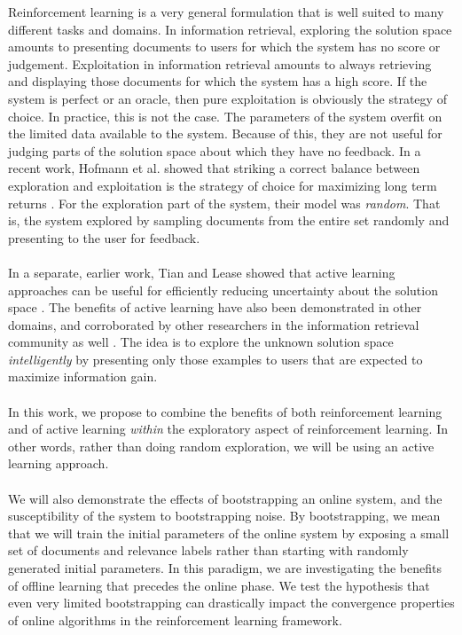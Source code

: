 \documentclass{acm_proc_article-sp}
\begin{document}
Reinforcement learning is a very general formulation that is well suited to many different tasks and domains. In information retrieval, exploring the solution space amounts to presenting documents to users for which the system has no score or judgement. Exploitation in information retrieval amounts to always retrieving and displaying those documents for which the system has a high score. If the system is perfect or an oracle, then pure exploitation is obviously the strategy of choice. In practice, this is not the case. The parameters of the system overfit on the limited data available to the system. Because of this, they are not useful for judging parts of the solution space about which they have no feedback. In a recent work, Hofmann et al. showed that striking a correct balance between exploration and exploitation is the strategy of choice for maximizing long term returns \cite{hofmann}. For the exploration part of the system, their model was \emph{random}. That is, the system explored by sampling documents from the entire set randomly and presenting to the user for feedback. \\ \\
In a separate, earlier work, Tian and Lease showed that active learning approaches can be useful for efficiently reducing uncertainty about the solution space \cite{aibo}. The benefits of active learning have also been demonstrated in other domains, and corroborated by other researchers in the information retrieval community as well \cite{active2}. The idea is to explore the unknown solution space \emph{intelligently} by presenting only those examples to users that are expected to maximize information gain. \\ \\
In this work, we propose to combine the benefits of both reinforcement learning and of active learning \emph{within} the exploratory aspect of reinforcement learning. In other words, rather than doing random exploration, we will be using an active learning approach. \\ \\
We will also demonstrate the effects of bootstrapping an online system, and the susceptibility of the system to bootstrapping noise. By bootstrapping, we mean that we will train the initial parameters of the online system by exposing a small set of documents and relevance labels rather than starting with randomly generated initial parameters. In this paradigm, we are investigating the benefits of offline learning that precedes the online phase. We test the hypothesis that even very limited bootstrapping can drastically impact the convergence properties of online algorithms in the reinforcement learning framework. 
\end{document}
